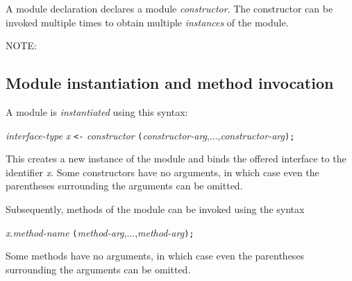 
A module declaration declares a module \emph{constructor}. The
constructor can be invoked multiple times to obtain multiple
\emph{instances} of the module.

\vspace{2ex}

NOTE:


\subsection{Module instantiation and method invocation}


A module is \emph{instantiated} using this syntax:

\hm \emph{interface-type} \emph{x} {\tt <-} \emph{constructor} {\tt (}\emph{constructor-arg},...,\emph{constructor-arg}{\tt );}

This creates a new instance of the module and binds the offered
interface to the identifier \emph{x}.  Some constructors have no
arguments, in which case even the parentheses surrounding the
arguments can be omitted.

Subsequently, methods of the module can be invoked using the syntax


\hmmmm \emph{x}.\emph{method-name} {\tt (}\emph{method-arg},...,\emph{method-arg}{\tt );}

Some methods have no arguments, in which case even the parentheses
surrounding the arguments can be omitted.

